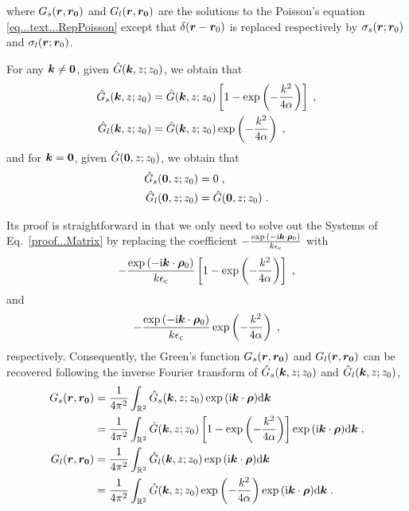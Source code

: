 where $ G_s(\boldsymbol{r}, \boldsymbol{r_0})$ and $ G_l(\boldsymbol{r}, \boldsymbol{r_0})$ are the solutions to the   Poisson's equation \eqref{eq...text...RepPoisson}  except that $\delta(\boldsymbol{r}-\boldsymbol{r}_0)$ is replaced respectively by $\sigma_s  (\boldsymbol{r};\boldsymbol{r}_0)$ and $\sigma_l  (\boldsymbol{r};\boldsymbol{r}_0)$.
\begin{corollary}
For any $\bm{k}\neq \bm{0}$, given     $\hat{G}(\bm{k}, z; z_0)$, we obtain that  
    \begin{align*}
        \hat{G}_s(\bm{k}, z; z_0)&=\hat{G}(\bm{k}, z; z_0)\left[1-\exp\left(-\frac{k^2}{4\alpha}\right)\right]\;,\\
        \hat{G}_l(\bm{k}, z; z_0)&=\hat{G}(\bm{k}, z; z_0)\exp\left(-\frac{k^2}{4\alpha}\right)\;,
    \end{align*} 
    and for  $\bm{k}=\bm{0}$, given     $\hat{G}(\bm{0}, z; z_0)$, we obtain that  
        \begin{align*}
        \hat{G}_s(\bm{0}, z; z_0)&=0\;,\\
        \hat{G}_l(\bm{0}, z; z_0)&=\hat{G}(\bm{0}, z; z_0)\;.
    \end{align*} 
\end{corollary}
Its proof is straightforward in that we only need to solve out the Systems of Eq.~\eqref{proof...Matrix} by replacing  the coefficient $-\frac{\exp{(-\mathrm{i} \boldsymbol{k} \cdot \boldsymbol{\rho}_0)}}{k\epsilon_{\mathrm{c}}}$ with  
\begin{equation*}
    -\frac{\exp{(-\mathrm{i} \boldsymbol{k} \cdot \boldsymbol{\rho}_0)}}{k\epsilon_{\mathrm{c}}}\left[1-\exp\left(-\frac{k^2}{4\alpha}\right)\right]\;,
\end{equation*}
and 
\begin{equation*}
    -\frac{\exp{(-\mathrm{i} \boldsymbol{k} \cdot \boldsymbol{\rho}_0)}}{k\epsilon_{\mathrm{c}}}\exp\left(-\frac{k^2}{4\alpha}\right)\;,
\end{equation*} 
respectively.
Consequently, the Green's function $ G_s(\boldsymbol{r}, \boldsymbol{r_0})$ and $ G_l(\boldsymbol{r}, \boldsymbol{r_0})$ can be recovered following the inverse Fourier transform of $  \hat{G}_s(\bm{k}, z; z_0)$ and $  \hat{G}_l(\bm{k}, z; z_0)$,
\begin{equation*}
\begin{aligned}
 G_s(\boldsymbol{r}, \boldsymbol{r_0})&=   \frac{1}{4\pi^2}\int_{\mathbb{R}^2} \hat{G}_s(\bm{k}, z; z_0)\exp{(\mathrm{i} \boldsymbol{k} \cdot \boldsymbol{\rho})} \mathrm{d} \bm{k}\\
 &= \frac{1}{4\pi^2}\int_{\mathbb{R}^2} \hat{G}(\bm{k}, z; z_0)\left[1-\exp\left(-\frac{k^2}{4\alpha}\right)\right]\exp{(\mathrm{i} \boldsymbol{k} \cdot \boldsymbol{\rho})} \mathrm{d} \bm{k}\;,\\
 G_l(\boldsymbol{r}, \boldsymbol{r_0})&=   \frac{1}{4\pi^2}\int_{\mathbb{R}^2} \hat{G}_l(\bm{k}, z; z_0)\exp{(\mathrm{i} \boldsymbol{k} \cdot \boldsymbol{\rho})} \mathrm{d} \bm{k}\\
 &= \frac{1}{4\pi^2}\int_{\mathbb{R}^2} \hat{G}(\bm{k}, z; z_0)\exp\left(-\frac{k^2}{4\alpha}\right)\exp{(\mathrm{i} \boldsymbol{k} \cdot \boldsymbol{\rho})} \mathrm{d} \bm{k}\;.
\end{aligned}    
\end{equation*}
